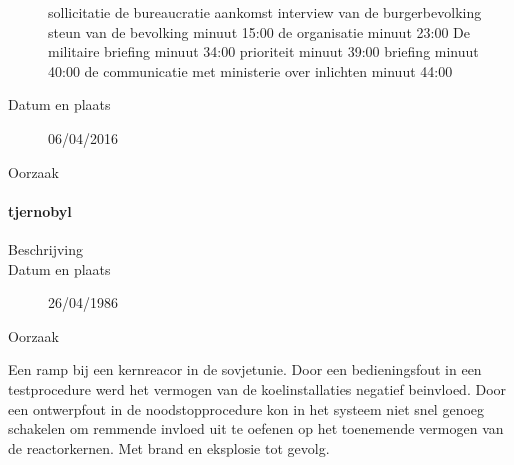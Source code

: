 \begin{description}
	\cite{isitman06012016militair}
	\cite{nporadio11072016filmdemissie}
	\cite{parlementairmonitor15122013mortierongeluk}
	sollicitatie
	de bureaucratie
	aankomst
	interview van de burgerbevolking
	steun van de bevolking minuut 15:00
	de organisatie minuut 23:00
	De militaire briefing minuut 34:00
	prioriteit minuut 39:00
	briefing minuut 40:00
	de communicatie met ministerie over inlichten minuut 44:00
	\cite{DemissieFilm}
	
	
	\item[Datum en plaats] 06/04/2016
	\item[Oorzaak]
\end{description}

\paragraph{tjernobyl}

\begin{description}
	\item[Beschrijving]
	\item[Datum en plaats] 26/04/1986
	\item[Oorzaak]
\end{description}
Een ramp bij een kernreacor in de sovjetunie. Door een bedieningsfout in een testprocedure werd het vermogen van de koelinstallaties negatief beinvloed. Door een ontwerpfout in de noodstopprocedure kon in het systeem niet snel genoeg schakelen om remmende invloed uit te oefenen op het toenemende vermogen van de reactorkernen. Met brand en eksplosie tot gevolg.

